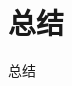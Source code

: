 \documentclass{ctexbeamer}
\begin{document}
\section{总结}

\begin{frame}{总结}

\end{frame}
\end{document}
